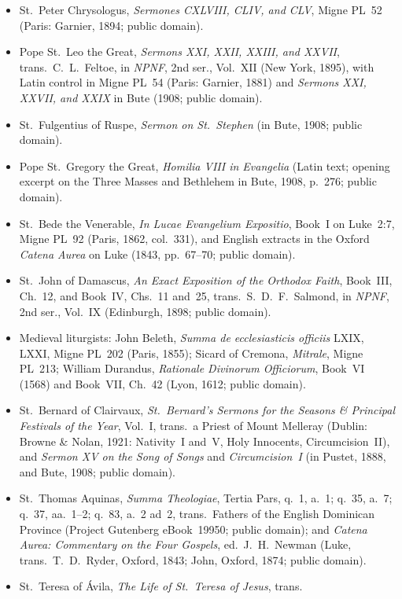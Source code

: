 \begin{itemize}
\textit{Catena Aurea} on Luke (1843, p.~70; public domain).
\item St.~Peter Chrysologus, \textit{Sermones CXLVIII, CLIV, and CLV}, Migne
PL~52 (Paris: Garnier, 1894; public domain).
\item Pope St.~Leo the Great, \textit{Sermons XXI, XXII, XXIII, and XXVII},
trans.\ C.~L.~Feltoe, in \textit{NPNF}, 2nd ser., Vol.~XII (New York, 1895),
with Latin control in Migne PL~54 (Paris: Garnier, 1881) and \textit{Sermons
XXI, XXVII, and XXIX} in Bute (1908; public domain).
\item St.~Fulgentius of Ruspe, \textit{Sermon on St.~Stephen} (in Bute, 1908;
public domain).
\item Pope St.~Gregory the Great, \textit{Homilia VIII in Evangelia} (Latin
text; opening excerpt on the Three Masses and Bethlehem in Bute, 1908, p.~276;
public domain).
\item St.~Bede the Venerable, \textit{In Lucae Evangelium Expositio}, Book~I on
Luke~2:7, Migne PL~92 (Paris, 1862, col.~331), and English extracts in the Oxford
\textit{Catena Aurea} on Luke (1843, pp.~67--70; public domain).
\item St.~John of Damascus, \textit{An Exact Exposition of the Orthodox Faith},
Book~III, Ch.~12, and Book~IV, Chs.~11 and~25, trans.\ S.~D.~F.~Salmond, in
\textit{NPNF}, 2nd ser., Vol.~IX (Edinburgh, 1898; public domain).
\item Medieval liturgists: John Beleth, \textit{Summa de ecclesiasticis
officiis} LXIX, LXXI, Migne PL~202 (Paris, 1855); Sicard of Cremona,
\textit{Mitrale}, Migne PL~213; William Durandus, \textit{Rationale Divinorum
Officiorum}, Book~VI (1568) and Book~VII, Ch.~42 (Lyon, 1612; public domain).
\item St.~Bernard of Clairvaux, \textit{St.~Bernard's Sermons for the Seasons \&
Principal Festivals of the Year}, Vol.~I, trans.\ a Priest of Mount Melleray
(Dublin: Browne \& Nolan, 1921: Nativity~I and~V, Holy Innocents,
Circumcision~II), and \textit{Sermon XV on the Song of Songs} and
\textit{Circumcision~I} (in Pustet, 1888, and Bute, 1908; public domain).
\item St.~Thomas Aquinas, \textit{Summa Theologiae}, Tertia Pars, q.~1, a.~1;
q.~35, a.~7; q.~37, aa.~1--2; q.~83, a.~2 ad~2, trans.\ Fathers of the English
Dominican Province (Project Gutenberg eBook~19950; public domain); and
\textit{Catena Aurea: Commentary on the Four Gospels}, ed.\ J.~H.~Newman (Luke,
trans.\ T.~D.~Ryder, Oxford, 1843; John, Oxford, 1874; public domain).
\item St.~Teresa of \'Avila, \textit{The Life of St.~Teresa of Jesus}, trans.\

\end{itemize}
